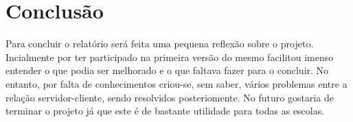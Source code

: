 \documentclass[12pt, twoside]{report}
\begin{document}
	
	
	
	\chapter{Conclusão}
	Para concluir o relatório será feita uma pequena reflexão sobre o projeto. Incialmente por ter participado na primeira versão do mesmo facilitou imenso entender o que podia ser melhorado e o que faltava fazer para o concluir. No entanto, por falta de conhecimentos criou-se, sem saber, vários problemas entre a relação servidor-cliente, sendo resolvidos posteriomente.
	No futuro gostaria de terminar o projeto já que este é de bastante utilidade para todas as escolas.


	
	
\end{document}
